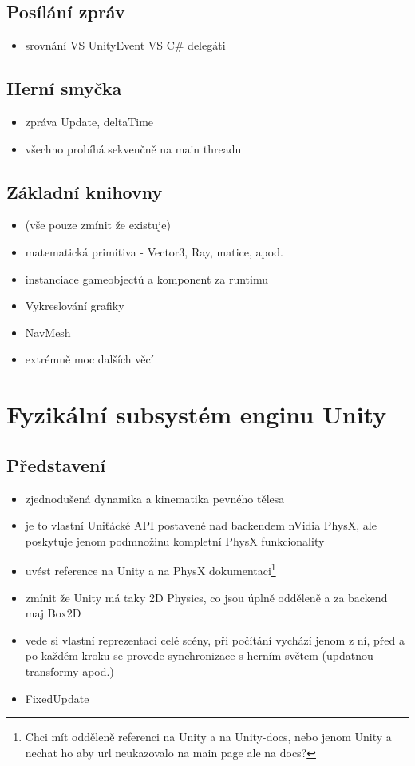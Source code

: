 \subsection{Posílání zpráv}
\begin{itemize}
    \item srovnání VS UnityEvent VS C\# delegáti 
\end{itemize}

\subsection{Herní smyčka}
\begin{itemize}
    \item zpráva Update, deltaTime
    \item všechno probíhá sekvenčně na main threadu
\end{itemize}

\subsection{Základní knihovny}
\begin{itemize}
    \item (vše pouze zmínit že existuje)
    \item matematická primitiva - Vector3, Ray, matice, apod.
    \item instanciace gameobjectů a komponent za runtimu
    \item Vykreslování grafiky
    \item NavMesh
    \item extrémně moc dalších věcí
\end{itemize}


\section{Fyzikální subsystém enginu Unity}

\subsection{Představení}
\begin{itemize}
    \item zjednodušená dynamika a kinematika pevného tělesa
    \item je to vlastní Uniťácké API postavené nad backendem nVidia PhysX, ale poskytuje jenom podmnožinu kompletní PhysX funkcionality
    \item uvést reference na Unity a na PhysX dokumentaci\footnote{Chci mít odděleně referenci na Unity a na Unity-docs, nebo jenom Unity a nechat ho aby url neukazovalo na main page ale na docs?}
    \item zmínit že Unity má taky 2D Physics, co jsou úplně odděleně a za backend maj Box2D 
    \item vede si vlastní reprezentaci celé scény, při počítání vychází jenom z ní, před a po každém kroku se provede synchronizace s herním světem (updatnou transformy apod.)
    \item FixedUpdate
\end{itemize}


